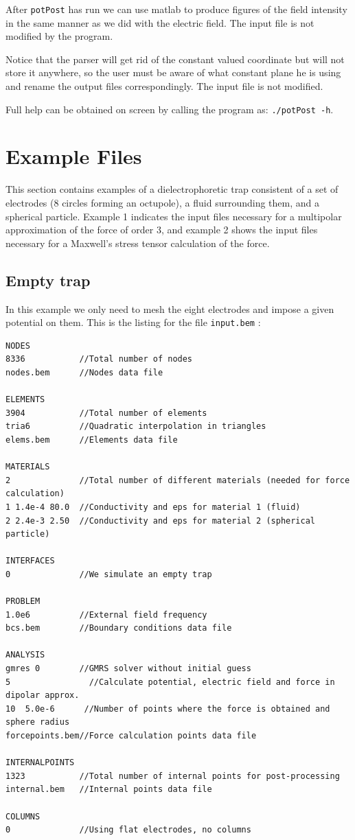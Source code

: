 \documentclass[12pt]{article}
\begin{document}
After \verb+potPost+ has run we can use matlab to produce figures of the field intensity in the same manner as we did with the electric field. The input file is not modified by the program.

Notice that the parser will get rid of the constant valued coordinate but will not store it anywhere, so the user must be aware of what constant plane he is using and rename the output files correspondingly. The input file is not modified.

Full help can be obtained on screen by calling the program as: \texttt{./potPost -h}.

\pagebreak

\section{Example Files}
This section contains examples of a dielectrophoretic trap consistent of a set of electrodes (8 circles forming an octupole), a fluid surrounding them, and a spherical particle. Example 1 indicates the input files necessary for a multipolar approximation of the force of order 3, and example 2 shows the input files necessary for a Maxwell's stress tensor calculation of the force.

\subsection{Empty trap}
In this example we only need to mesh the eight electrodes and impose a given potential on them. This is the listing for the file \verb+input.bem+ :

\small\begin{verbatim}
NODES
8336           //Total number of nodes   
nodes.bem      //Nodes data file

ELEMENTS
3904           //Total number of elements
tria6          //Quadratic interpolation in triangles
elems.bem      //Elements data file

MATERIALS
2              //Total number of different materials (needed for force calculation)
1 1.4e-4 80.0  //Conductivity and eps for material 1 (fluid)
2 2.4e-3 2.50  //Conductivity and eps for material 2 (spherical particle)

INTERFACES
0              //We simulate an empty trap

PROBLEM
1.0e6          //External field frequency
bcs.bem        //Boundary conditions data file

ANALYSIS
gmres 0	       //GMRS solver without initial guess 
5	             //Calculate potential, electric field and force in dipolar approx.
10	5.0e-6      //Number of points where the force is obtained and sphere radius
forcepoints.bem//Force calculation points data file

INTERNALPOINTS
1323           //Total number of internal points for post-processing
internal.bem   //Internal points data file

COLUMNS
0              //Using flat electrodes, no columns
\end{verbatim}\normalsize
\end{document}
